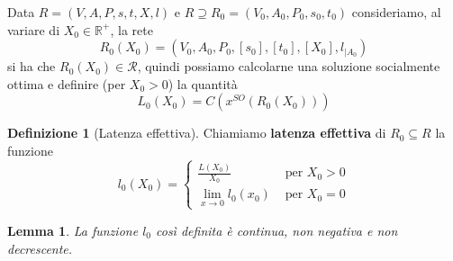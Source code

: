 \documentclass[a4paper]{article}
\newcounter{counter1}
\theoremstyle{plain}
\newtheorem{mylem}[counter1]{Lemma}
\theoremstyle{definition}
\newtheorem{mydef}[counter1]{Definizione}
\theoremstyle{remark}
\newcommand{\pa}[1]{\left(#1\right)}
\newcommand{\bra}[1]{\left[#1\right]}
\begin{document}
Data $R=(V,A,P,s,t,X,l)$ e $R\supseteq R_0 =(V_0,A_0,P_0,s_0,t_0)$
consideriamo, al variare di $X_0\in \mathbb{R}^+$, la rete
\[ R_0\pa{X_0} = \pa{V_0,A_0,P_0,\bra{s_0},\bra{t_0},\bra{X_0},
    l_{\mid A_0}} \]
si ha che $R_0\pa{X_0}\in \mathcal{R}$, quindi possiamo calcolarne una
soluzione socialmente ottima e definire (per $X_0>0$) la quantità
\[ L_0\pa{X_0} = C\pa{x^{SO}\pa{R_0\pa{X_0}}} \]
\begin{mydef}[Latenza effettiva]
  Chiamiamo \textbf{latenza effettiva} di $R_0 \subseteq R$ la
  funzione
  \[ l_0\pa{X_0} = \left\{
      \begin{matrix}
        \frac{L\pa{X_0}}{X_0} & \text{ per } X_0 > 0 \\
        \lim _{x\to 0} l_0\pa{x_0} & \text{ per } X_0 = 0
      \end{matrix}
    \right. \]
\end{mydef}
\begin{mylem}
\label{lem:l0-regolare}
  La funzione $l_0$ così definita è continua, non negativa e non
  decrescente.
\end{mylem}
\end{document}
